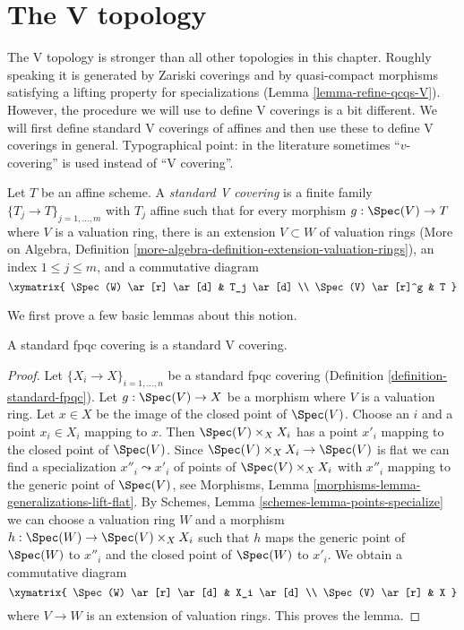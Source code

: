 \section{The V topology}
\label{section-V}

\noindent
The V topology is stronger than all other topologies in this chapter.
Roughly speaking it is generated by Zariski coverings and
by quasi-compact morphisms satisfying a lifting property
for specializations (Lemma \ref{lemma-refine-qcqs-V}).
However, the procedure we will use to define V coverings is a bit different.
We will first define standard V coverings of affines and then
use these to define V coverings in general. Typographical point:
in the literature sometimes ``$v$-covering'' is used instead of ``V covering''.

\begin{definition}
\label{definition-standard-V-covering}
Let $T$ be an affine scheme. A {\it standard V covering} is a finite family
$\{T_j \to T\}_{j = 1, \ldots, m}$ with $T_j$ affine
such that for every morphism $g : \Spec(V) \to T$ where $V$
is a valuation ring, there is an extension $V \subset W$ of valuation rings
(More on Algebra, Definition
\ref{more-algebra-definition-extension-valuation-rings}),
an index $1 \leq j \leq m$, and a commutative diagram
$$
\xymatrix{
\Spec(W) \ar[r] \ar[d] & T_j \ar[d] \\
\Spec(V) \ar[r]^g & T
}
$$
\end{definition}

\noindent
We first prove a few basic lemmas about this notion.

\begin{lemma}
\label{lemma-standard-fpqc-standard-V}
A standard fpqc covering is a standard V covering.
\end{lemma}

\begin{proof}
Let $\{X_i \to X\}_{i = 1, \ldots, n}$ be a standard fpqc covering
(Definition \ref{definition-standard-fpqc}). Let $g : \Spec(V) \to X$
be a morphism where $V$ is a valuation ring. Let $x \in X$ be the
image of the closed point of $\Spec(V)$. Choose an $i$ and a point
$x_i \in X_i$ mapping to $x$. Then $\Spec(V) \times_X X_i$
has a point $x'_i$ mapping to the closed point of $\Spec(V)$.
Since $\Spec(V) \times_X X_i \to \Spec(V)$ is flat
we can find a specialization $x''_i \leadsto x'_i$ of
points of $\Spec(V) \times_X X_i$ with $x''_i$ mapping to
the generic point of $\Spec(V)$, see
Morphisms, Lemma \ref{morphisms-lemma-generalizations-lift-flat}. By
Schemes, Lemma \ref{schemes-lemma-points-specialize}
we can choose a valuation ring $W$ and a morphism
$h : \Spec(W) \to \Spec(V) \times_X X_i$ such that $h$
maps the generic point of $\Spec(W)$ to $x''_i$ and the
closed point of $\Spec(W)$ to $x'_i$. We obtain a
commutative diagram
$$
\xymatrix{
\Spec(W) \ar[r] \ar[d] & X_i \ar[d] \\
\Spec(V) \ar[r] & X
}
$$
where $V \to W$ is an extension of valuation rings.
This proves the lemma.
\end{proof}

